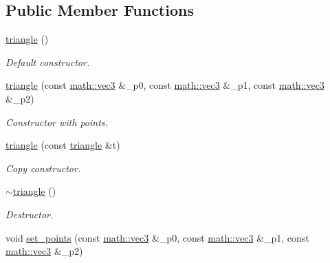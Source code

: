 \subsection*{Public Member Functions}
\begin{DoxyCompactItemize}
\item 
\mbox{\label{classphysim_1_1geometry_1_1triangle_a15efd231cb09e3faed6eb247f060ca66}} 
\hyperlink{classphysim_1_1geometry_1_1triangle_a15efd231cb09e3faed6eb247f060ca66}{triangle} ()
\begin{DoxyCompactList}\small\item\em Default constructor. \end{DoxyCompactList}\item 
\hyperlink{classphysim_1_1geometry_1_1triangle_a4e0a11057c6297dbe03c193d52e7e212}{triangle} (const \hyperlink{structphysim_1_1math_1_1vec3}{math\+::vec3} \&\+\_\+p0, const \hyperlink{structphysim_1_1math_1_1vec3}{math\+::vec3} \&\+\_\+p1, const \hyperlink{structphysim_1_1math_1_1vec3}{math\+::vec3} \&\+\_\+p2)
\begin{DoxyCompactList}\small\item\em Constructor with points. \end{DoxyCompactList}\item 
\mbox{\label{classphysim_1_1geometry_1_1triangle_ab45719d2021233260e8ca28362711fb2}} 
\hyperlink{classphysim_1_1geometry_1_1triangle_ab45719d2021233260e8ca28362711fb2}{triangle} (const \hyperlink{classphysim_1_1geometry_1_1triangle}{triangle} \&t)
\begin{DoxyCompactList}\small\item\em Copy constructor. \end{DoxyCompactList}\item 
\mbox{\label{classphysim_1_1geometry_1_1triangle_ac48a9492d0b28bd46a235bba375f942b}} 
\hyperlink{classphysim_1_1geometry_1_1triangle_ac48a9492d0b28bd46a235bba375f942b}{$\sim$triangle} ()
\begin{DoxyCompactList}\small\item\em Destructor. \end{DoxyCompactList}\item 
void \hyperlink{classphysim_1_1geometry_1_1triangle_a3009b26592dd9b08611b116b5439fac7}{set\+\_\+points} (const \hyperlink{structphysim_1_1math_1_1vec3}{math\+::vec3} \&\+\_\+p0, const \hyperlink{structphysim_1_1math_1_1vec3}{math\+::vec3} \&\+\_\+p1, const \hyperlink{structphysim_1_1math_1_1vec3}{math\+::vec3} \&\+\_\+p2)

\end{DoxyCompactItemize}
